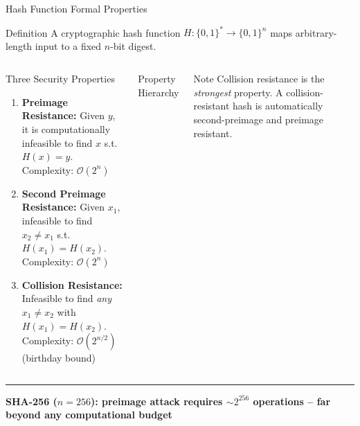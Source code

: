 \documentclass[8pt,aspectratio=169]{beamer}
\newcommand{\bottomnote}[1]{\vfill\vspace{-2mm}\textcolor{mllavender2}{\rule{\textwidth}{0.4pt}}\vspace{1mm}\footnotesize\textbf{#1}}
\begin{document}
\begin{frame}{Hash Function Formal Properties}
\begin{block}{Definition}
\small A cryptographic hash function $H:\{0,1\}^{*} \to \{0,1\}^{n}$ maps arbitrary-length input to a fixed $n$-bit digest.
\end{block}
\vspace{1mm}
\begin{columns}
\begin{block}{Three Security Properties}
\begin{enumerate}\small
  \item \textbf{Preimage Resistance:}
    Given $y$, it is computationally infeasible to find $x$ s.t.\ $H(x)=y$.\\
    Complexity: $\mathcal{O}(2^{n})$
  \item \textbf{Second Preimage Resistance:}
    Given $x_1$, infeasible to find $x_2 \neq x_1$ s.t.\ $H(x_1)=H(x_2)$.\\
    Complexity: $\mathcal{O}(2^{n})$
  \item \textbf{Collision Resistance:}
    Infeasible to find \emph{any} $x_1 \neq x_2$ with $H(x_1)=H(x_2)$.\\
    Complexity: $\mathcal{O}(2^{n/2})$ (birthday bound)
\end{enumerate}
\end{block}
\begin{block}{Property Hierarchy}
\begin{center}
\end{center}
\end{block}
\vspace{1mm}
\begin{alertblock}{Note}
\small Collision resistance is the \emph{strongest} property. A collision-resistant hash is automatically second-preimage and preimage resistant.
\end{alertblock}
\end{columns}
\bottomnote{SHA-256 ($n=256$): preimage attack requires $\sim 2^{256}$ operations -- far beyond any computational budget}
\end{frame}
\end{document}

